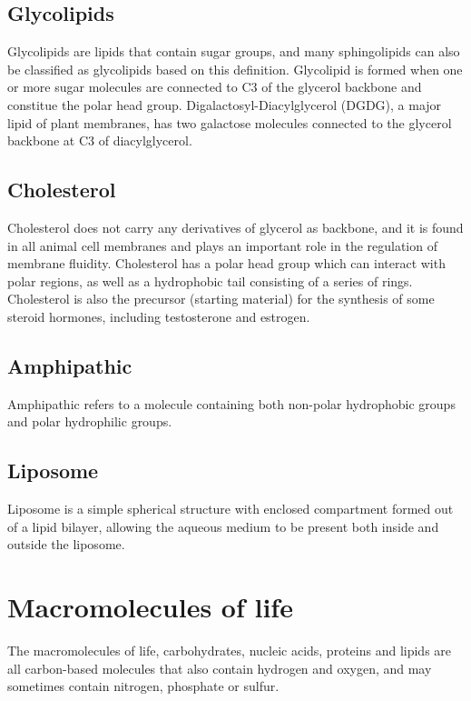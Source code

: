 \documentclass[11pt]{article}
\begin{document}
\subsection{Glycolipids}
\label{sec:org70ca662}
Glycolipids are lipids that contain sugar groups, and many sphingolipids can also be classified as glycolipids based on this definition. Glycolipid is formed when one or more sugar molecules are connected to C3 of the glycerol backbone and constitue the polar head group. Digalactosyl-Diacylglycerol (DGDG), a major lipid of plant membranes, has two galactose molecules connected to the glycerol backbone at C3 of diacylglycerol.

\subsection{Cholesterol}
\label{sec:org2c9fb9f}
Cholesterol does not carry any derivatives of glycerol as backbone, and it is found in all animal cell membranes and plays an important role in the regulation of membrane fluidity. Cholesterol has a polar head group which can interact with polar regions, as well as a hydrophobic tail consisting of a series of rings. Cholesterol is also the precursor (starting material) for the synthesis of some steroid hormones, including testosterone and estrogen.

\subsection{Amphipathic}
\label{sec:orgd1e519a}
Amphipathic refers to a molecule containing both non-polar hydrophobic groups and polar hydrophilic groups.

\subsection{Liposome}
\label{sec:org98e83d5}
Liposome is a simple spherical structure with enclosed compartment formed out of a lipid bilayer, allowing the aqueous medium to be present both inside and outside the liposome.

\section{Macromolecules of life}
\label{sec:org8da150d}
The macromolecules of life, carbohydrates, nucleic acids, proteins and lipids are all carbon-based molecules that also contain hydrogen and oxygen, and may sometimes contain nitrogen, phosphate or sulfur.
\\[0pt]
\end{document}
